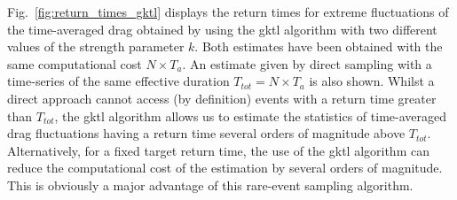 \documentclass{jfm}
\newcommand{\EL}[1]{{\color{myred}{#1}}}
\begin{document}


%

Fig.~\ref{fig:return_times_gktl} displays the return times for extreme fluctuations of the time-averaged drag obtained by using the \ac{gktl} algorithm with two different values of the strength parameter $k$.  
%
Both estimates have been obtained with the same computational cost $N\times T_a$.
An estimate given by direct sampling with a time-series of the same effective duration $T_{tot}=N\times T_a$ is also shown. 
Whilst a direct approach cannot access (by definition) events with a return time greater than $T_{tot}$, the \ac{gktl} algorithm allows us to estimate the statistics of time-averaged drag fluctuations having a return time several orders of magnitude above $T_{tot}$. Alternatively, for a fixed target return time, the use of the \ac{gktl} algorithm can reduce the computational cost of the estimation by several orders of magnitude. This is  obviously a major advantage of this rare-event sampling algorithm. 
%
\end{document}
